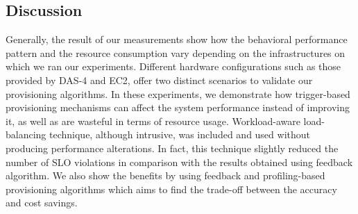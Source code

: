 \subsection{Discussion}



Generally, the result of our measurements show how the behavioral performance pattern and the resource consumption vary depending on the infrastructures on which we ran our experiments. Different hardware configurations such as those provided by DAS-4 and EC2, offer two distinct scenarios to validate our provisioning algorithms.  In these experiments, we demonstrate how trigger-based provisioning mechanisms can affect the system performance instead of improving it, as well as are wasteful in terms of resource usage. Workload-aware load-balancing technique, although intrusive, was included and used without producing performance alterations. In fact, this technique slightly reduced the number of SLO violations in comparison with the results obtained using feedback algorithm. We also show the benefits by using feedback and profiling-based provisioning algorithms which aims to find the trade-off between the accuracy and cost savings. 





